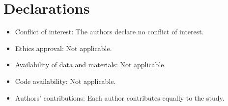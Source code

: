 \documentclass[12pt]{amsart}
\theoremstyle{definition}
\begin{document}
\section*{Declarations}

\begin{itemize}
\item Conflict of interest: The authors declare no conflict of interest.

\item Ethics approval: Not applicable.

\item Availability of data and materials: Not applicable.

\item Code availability: Not applicable.

\item Authors’ contributions: Each author contributes equally to the study.
\end{itemize}
\end{document}
